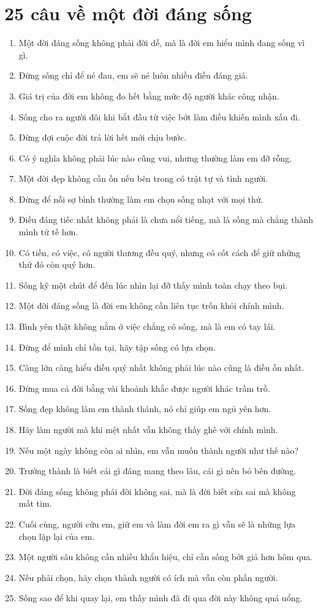 \section{25 câu về một đời đáng sống}
\begin{enumerate}[leftmargin=*,resume]
\item Một đời đáng sống không phải đời dễ, mà là đời em hiểu mình đang sống vì gì.
\item Đừng sống chỉ để né đau, em sẽ né luôn nhiều điều đáng giá.
\item Giá trị của đời em không đo hết bằng mức độ người khác công nhận.
\item Sống cho ra người đôi khi bắt đầu từ việc bớt làm điều khiến mình xấu đi.
\item Đừng đợi cuộc đời trả lời hết mới chịu bước.
\item Có ý nghĩa không phải lúc nào cũng vui, nhưng thường làm em đỡ rỗng.
\item Một đời đẹp không cần ồn nếu bên trong có trật tự và tình người.
\item Đừng để nỗi sợ bình thường làm em chọn sống nhạt với mọi thứ.
\item Điều đáng tiếc nhất không phải là chưa nổi tiếng, mà là sống mà chẳng thành mình tử tế hơn.
\item Có tiền, có việc, có người thương đều quý, nhưng có cốt cách để giữ những thứ đó còn quý hơn.
\item Sống kỹ một chút để đến lúc nhìn lại đỡ thấy mình toàn chạy theo bụi.
\item Một đời đáng sống là đời em không cần liên tục trốn khỏi chính mình.
\item Bình yên thật không nằm ở việc chẳng có sóng, mà là em có tay lái.
\item Đừng để mình chỉ tồn tại, hãy tập sống có lựa chọn.
\item Càng lớn càng hiểu điều quý nhất không phải lúc nào cũng là điều ồn nhất.
\item Đừng mua cả đời bằng vài khoảnh khắc được người khác trầm trồ.
\item Sống đẹp không làm em thành thánh, nó chỉ giúp em ngủ yên hơn.
\item Hãy làm người mà khi mệt nhất vẫn không thấy ghê với chính mình.
\item Nếu một ngày không còn ai nhìn, em vẫn muốn thành người như thế nào?
\item Trưởng thành là biết cái gì đáng mang theo lâu, cái gì nên bỏ bên đường.
\item Đời đáng sống không phải đời không sai, mà là đời biết sửa sai mà không mất tim.
\item Cuối cùng, người cứu em, giữ em và làm đời em ra gì vẫn sẽ là những lựa chọn lặp lại của em.
\item Một người sâu không cần nhiều khẩu hiệu, chỉ cần sống bớt giả hơn hôm qua.
\item Nếu phải chọn, hãy chọn thành người có ích mà vẫn còn phần người.
\item Sống sao để khi quay lại, em thấy mình đã đi qua đời này không quá uổng.
\end{enumerate}